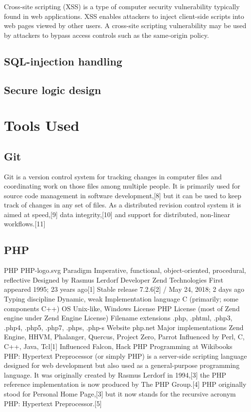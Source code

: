 \documentclass[12pt,a4paper]{article}
\begin{document}
\begin{flushleft}
	\begin{flushleft}
		Cross-site scripting (XSS) is a type of computer security vulnerability typically found in web applications. XSS enables attackers to inject client-side scripts into web pages viewed by other users. A cross-site scripting vulnerability may be used by attackers to bypass access controls such as the same-origin policy. 
	\end{flushleft}
	
	\subsection{SQL-injection handling}
	
	\subsection{Secure logic design}
	
	\section{Tools Used}
	\subsection{Git}
	Git is a version control system for tracking changes in computer files and coordinating work on those files among multiple people. It is primarily used for source code management in software development,[8] but it can be used to keep track of changes in any set of files. As a distributed revision control system it is aimed at speed,[9] data integrity,[10] and support for distributed, non-linear workflows.[11]
	\subsection{PHP}
	
	PHP
	PHP-logo.svg
	Paradigm	Imperative, functional, object-oriented, procedural, reflective
	Designed by	Rasmus Lerdorf
	Developer	Zend Technologies
	First appeared	1995; 23 years ago[1]
	Stable release	
	7.2.6[2] / May 24, 2018; 2 days ago
	Typing discipline	Dynamic, weak
	Implementation language	C (primarily; some components C++)
	OS	Unix-like, Windows
	License	PHP License (most of Zend engine under Zend Engine License)
	Filename extensions	.php, .phtml, .php3, .php4, .php5, .php7, .phps, .php-s
	Website	php.net
	Major implementations
	Zend Engine, HHVM, Phalanger, Quercus, Project Zero, Parrot
	Influenced by
	Perl, C, C++, Java, Tcl[1]
	Influenced
	Falcon, Hack
	PHP Programming at Wikibooks
	PHP: Hypertext Preprocessor (or simply PHP) is a server-side scripting language designed for web development but also used as a general-purpose programming language. It was originally created by Rasmus Lerdorf in 1994,[3] the PHP reference implementation is now produced by The PHP Group.[4] PHP originally stood for Personal Home Page,[3] but it now stands for the recursive acronym PHP: Hypertext Preprocessor.[5]
	

\end{flushleft}
\end{document}
